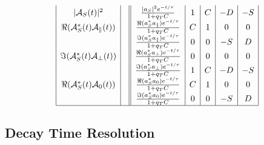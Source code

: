 \documentclass[a4paper,10pt,twosided]{article}
\begin{document}
\begin{equation}
\begin{array}{| c |c|| c | c | c | c | c |}
|{\cal A}_S(t)|^2                             &                                                                &\frac{  | a_S |^2 e^{-t/\tau}}{1+q_TC}                  & 1 &   C  &  -D & -S   \\
\Re({\cal A}_S^*(t){\cal A}_\parallel(t))     &                                                                &\frac{  \Re(a_S^*a_\parallel)e^{-t/\tau}}{1+q_TC}       & C &   1  &   0 &  0   \\
                                              &                                                                &\frac{  \Im(a_S^*a_\parallel)e^{-t/\tau}}{1+q_TC}       & 0 &   0  &  -S &  D   \\
\Im({\cal A}_S^*(t){\cal A}_\perp(t))         &                                                                &\frac{  \Re(a_S^* a_\perp)e^{-t/\tau}}{1+q_TC}          & 0 &   0  &   0 &  0   \\                         
                                              &                                                                &\frac{  \Im(a_S^* a_\perp)e^{-t/\tau}}{1+q_TC}          & 1 &   C  &  -D & -S   \\
\Re({\cal A}_S^*(t){\cal A}_0(t))             &                                                                &\frac{  \Re(a_S^* a_0)e^{-t/\tau}}{1+q_TC}              & C &   1  &   0 &  0   \\
                                              &                                                                &\frac{  \Im(a_S^* a_0)e^{-t/\tau}}{1+q_TC}              & 0 &   0  &  -S &  D   \\
\hline
\end{array}
\end{equation}

\pagebreak
\subsection{Decay Time Resolution}
\end{document}
